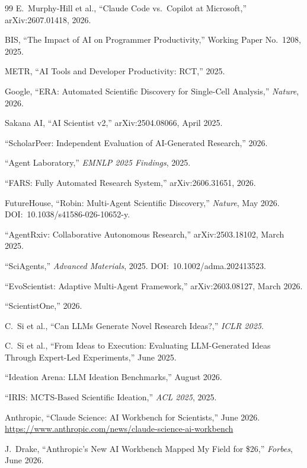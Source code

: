 \documentclass[11pt,a4paper]{article}
\begin{document}
\begin{thebibliography}{99}
E.~Murphy-Hill et al., ``Claude Code vs.\ Copilot at Microsoft,'' arXiv:2607.01418, 2026.

BIS, ``The Impact of AI on Programmer Productivity,'' Working Paper No.~1208, 2025.

METR, ``AI Tools and Developer Productivity: RCT,'' 2025.

Google, ``ERA: Automated Scientific Discovery for Single-Cell Analysis,'' \emph{Nature}, 2026.

Sakana AI, ``AI Scientist v2,'' arXiv:2504.08066, April 2025.

``ScholarPeer: Independent Evaluation of AI-Generated Research,'' 2026.

``Agent Laboratory,'' \emph{EMNLP 2025 Findings}, 2025.

``FARS: Fully Automated Research System,'' arXiv:2606.31651, 2026.

FutureHouse, ``Robin: Multi-Agent Scientific Discovery,'' \emph{Nature}, May 2026. DOI:~10.1038/s41586-026-10652-y.

``AgentRxiv: Collaborative Autonomous Research,'' arXiv:2503.18102, March 2025.

``SciAgents,'' \emph{Advanced Materials}, 2025. DOI:~10.1002/adma.202413523.

``EvoScientist: Adaptive Multi-Agent Framework,'' arXiv:2603.08127, March 2026.

``ScientistOne,'' 2026.

C.~Si et al., ``Can LLMs Generate Novel Research Ideas?,'' \emph{ICLR 2025}.

C.~Si et al., ``From Ideas to Execution: Evaluating LLM-Generated Ideas Through Expert-Led Experiments,'' June 2025.

``Ideation Arena: LLM Ideation Benchmarks,'' August 2026.

``IRIS: MCTS-Based Scientific Ideation,'' \emph{ACL 2025}, 2025.

Anthropic, ``Claude Science: AI Workbench for Scientists,'' June 2026. \url{https://www.anthropic.com/news/claude-science-ai-workbench}

J.~Drake, ``Anthropic's New AI Workbench Mapped My Field for \$26,'' \emph{Forbes}, June 2026.


\end{thebibliography}
\end{document}
